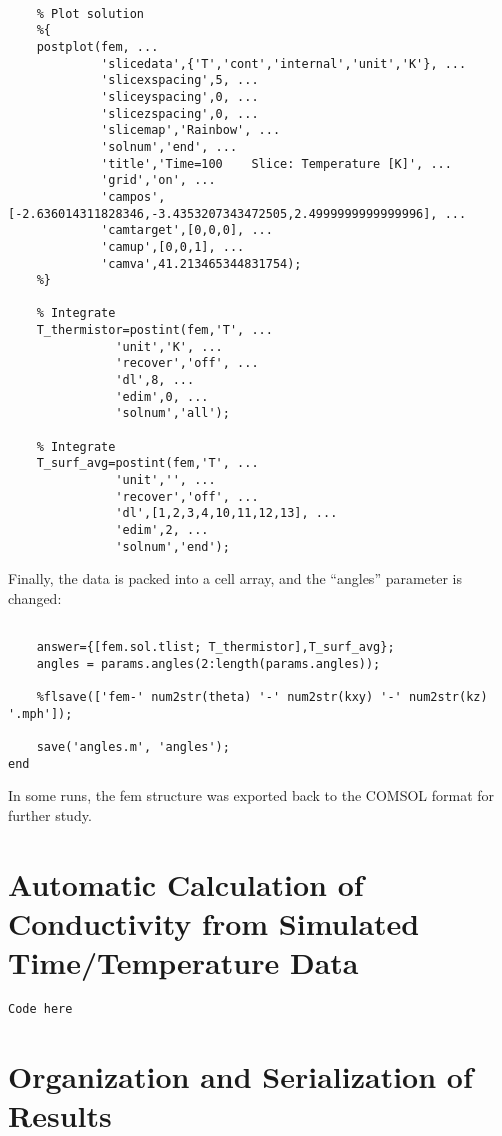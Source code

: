\small
\begin{verbatim}

    % Plot solution
    %{
    postplot(fem, ...
             'slicedata',{'T','cont','internal','unit','K'}, ...
             'slicexspacing',5, ...
             'sliceyspacing',0, ...
             'slicezspacing',0, ...
             'slicemap','Rainbow', ...
             'solnum','end', ...
             'title','Time=100    Slice: Temperature [K]', ...
             'grid','on', ...
             'campos',[-2.636014311828346,-3.4353207343472505,2.4999999999999996], ...
             'camtarget',[0,0,0], ...
             'camup',[0,0,1], ...
             'camva',41.213465344831754);
    %}

    % Integrate
    T_thermistor=postint(fem,'T', ...
               'unit','K', ...
               'recover','off', ...
               'dl',8, ...
               'edim',0, ...
               'solnum','all');

    % Integrate
    T_surf_avg=postint(fem,'T', ...
               'unit','', ...
               'recover','off', ...
               'dl',[1,2,3,4,10,11,12,13], ...
               'edim',2, ...
               'solnum','end');
\end{verbatim}
\normalsize

Finally, the data is packed into a cell array, and the ``angles'' parameter
is changed:

\small
\begin{verbatim}

    answer={[fem.sol.tlist; T_thermistor],T_surf_avg};
    angles = params.angles(2:length(params.angles));

    %flsave(['fem-' num2str(theta) '-' num2str(kxy) '-' num2str(kz) '.mph']);

    save('angles.m', 'angles');
end
\end{verbatim}
\normalsize

In some runs, the fem structure was exported back to the COMSOL format for
further study.

\section{Automatic Calculation of Conductivity from Simulated Time/Temperature Data}

\begin{verbatim}
Code here
\end{verbatim}

\section{Organization and Serialization of Results}

